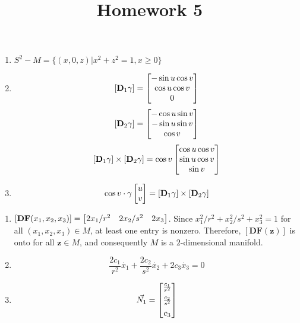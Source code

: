 \documentclass{homework}
\title{Homework 5}
\begin{document}
\maketitle

\begin{problem}{1}
\begin{enumerate}
\item $S^2 - M = \{(x, 0, z) | x^2 + z^2 = 1, x \geq 0\}$

\item
$$[\mathbf{D}_1\gamma] = \begin{bmatrix}-\sin u \cos v\\
                                \cos u \cos v\\
                                0\end{bmatrix}$$
$$[\mathbf{D}_2\gamma] = \begin{bmatrix}-\cos u \sin v\\
                               -\sin u \sin v\\
                                \cos v\end{bmatrix}$$
$$[\mathbf{D}_1\gamma] \times [\mathbf{D}_2\gamma] =
\cos v \begin{bmatrix}\cos u \cos v\\
             \sin u \cos v\\
             \sin v\end{bmatrix}$$

\item
$$\cos v \cdot \gamma\begin{bmatrix}u\\v\end{bmatrix}
= [\mathbf{D}_1\gamma] \times [\mathbf{D}_2\gamma]$$
\end{enumerate}
\end{problem}

\begin{problem}{2}
\begin{enumerate}
\item $[\mathbf{DF}(x_1, x_2, x_3)] = \begin{bmatrix}2x_1/r^2 & 2x_2/s^2 & 2x_3\end{bmatrix}$. Since
$x_1^2/r^2 + x_2^2/s^2 + x_3^2 = 1$ for all $(x_1, x_2, x_3) \in M$, at least
one entry is nonzero. Therefore, $[\mathbf{DF}(\mathbf{z})]$ is onto for all
$\mathbf{z} \in M$, and consequently $M$ is a $2$-dimensional manifold. \QED

\item $$\frac{2c_1}{r^2}\dot{x_1} +
        \frac{2c_2}{s^2}\dot{x_2} +
                    2c_3\dot{x_3} = 0$$

\item $$\vec{N_1} = \begin{bmatrix}\frac{c_1}{r^2}\\[4pt]
                          \frac{c_2}{s^2}\\[4pt]
                          c_3\end{bmatrix}$$
\end{enumerate}
\end{problem}
\end{document}
